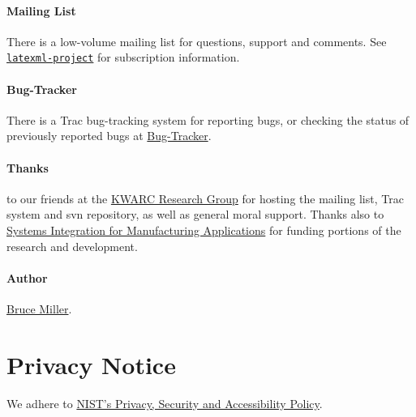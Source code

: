 \documentclass{article}
\begin{document}
\paragraph{Mailing List}
There is a low-volume mailing list for questions, support and comments.
See \href{http://lists.jacobs-university.de/mailman/listinfo/project-latexml}{\texttt{latexml-project}} for subscription information.


\paragraph{Bug-Tracker}
  There is a Trac bug-tracking system for reporting bugs, or checking the
  status of previously reported bugs at
 \href{https://trac.mathweb.org/LaTeXML/}{Bug-Tracker}.


\paragraph{Thanks} to our friends at
the \href{http://kwarc.info}{KWARC Research Group}
for hosting the mailing list, Trac system and svn repository,
as well as general moral support.
Thanks also to \href{http://nist.gov/sima}{Systems Integration for Manufacturing Applications}
for funding portions of the research and development.

\paragraph{Author} \href{mailto:bruce.miller@nist.gov}{Bruce Miller}.
\section{Privacy Notice}\label{privacy}
We adhere to \href{http://www.nist.gov/public_affairs/privacy.htm}{NIST's Privacy, Security and Accessibility Policy}.
\end{document}
